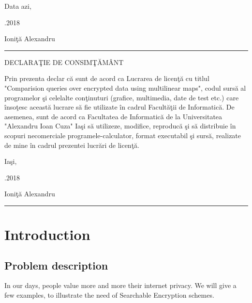 \documentclass[a4paper, 12pt, oneside]{article}
\begin{document}
\bigskip
\noindent Data azi,

.2018

\begin{flushright}
  Ioni\c t\u a Alexandru
  
  \rule{3.5cm}{0.4pt}
\end{flushright}

\newpage
\begin{center}
DECLARA\c TIE DE CONSIM\c T\u AMÂNT
\end{center}

\bigskip

\indent
\par Prin prezenta declar c\u a sunt de acord ca Lucrarea de licen\c t{\u a} cu titlul "Comparision queries over encrypted data using multilinear maps", codul surs\u a al programelor \c si celelalte con\c tinuturi (grafice, multimedia, date de test
etc.) care înso\c tesc aceast\u a lucrare s\u a fie utilizate în cadrul Facult\u a\c tii de Informatic\u a.
De asemenea, sunt de acord ca Facultatea de Informatic\u a de la Universitatea "Alexandru Ioan
Cuza" Ia\c si s\u a utilizeze, modifice, reproduc\u a \c si s\u a distribuie în scopuri necomerciale
programele-calculator, format executabil \c si surs\u a, realizate de mine în cadrul prezentei
lucr\u ari de licen\c t\u a.

\bigskip
\noindent Ia\c si,

.2018

\begin{flushright}
  Ioni\c t\u a Alexandru
  
  \rule{3.5cm}{0.4pt}
\end{flushright}

\newpage

\tableofcontents
\clearpage

\section{Introduction}
\subsection{Problem description}

In our days, people value more and more their internet privacy. We will give a few examples, to illustrate the need of Searchable Encryption schemes.
\end{document}
